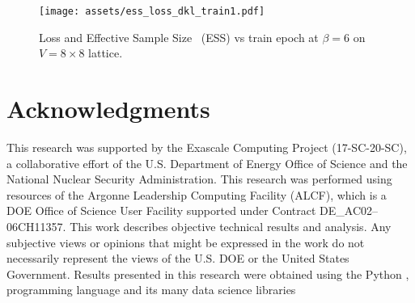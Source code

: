 \documentclass[a4paper,11pt]{article}
\begin{document}
\begin{figure}
    \centering
    \texttt{[image: assets/ess\_loss\_dkl\_train1.pdf]}
    \caption{\label{subfig:loss}Loss and Effective Sample
        Size~\cite{2018arXiv180904129E} (ESS) vs train epoch at \(\beta = 6\)
    on \(V = 8\times 8\) lattice.}
\end{figure}
%
\section{\label{sec:ack}Acknowledgments}
This research was supported by the Exascale Computing Project (17-SC-20-SC), a
collaborative effort of the U.S. Department of Energy Office of Science and the
National Nuclear Security Administration.
%
This research was performed using resources of the Argonne Leadership Computing
Facility (ALCF), which is a DOE Office of Science User Facility supported under
Contract DE\_AC02--06CH11357. 
%
This work describes objective technical results and analysis.
%
Any subjective views or opinions that might be expressed in the work do not
necessarily represent the views of the U.S. DOE or the United States
Government.
%
Results presented in this research were obtained using the Python
\citep{van1995python}, programming language and its many data science libraries
\cite{%
    matplotlib,
    harris2020array,
    ipython4160251%
}
%



\end{document}
